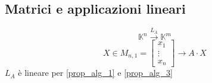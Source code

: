 \subsection{Matrici e applicazioni lineari}

  \begin{equation*}
    \mathbb{K}^n \xrightarrow{L_A} \mathbb{K}^m
  \end{equation*}
  \begin{equation}
    X\in M _{n,1} = \begin{bmatrix}
      x_1 \\
      \vdots \\
      x_n
    \end{bmatrix}\to A\cdot X
  \end{equation}
  $L_A$ è lineare per \ref{prop_alg_1} e \ref{prop_alg_3}




